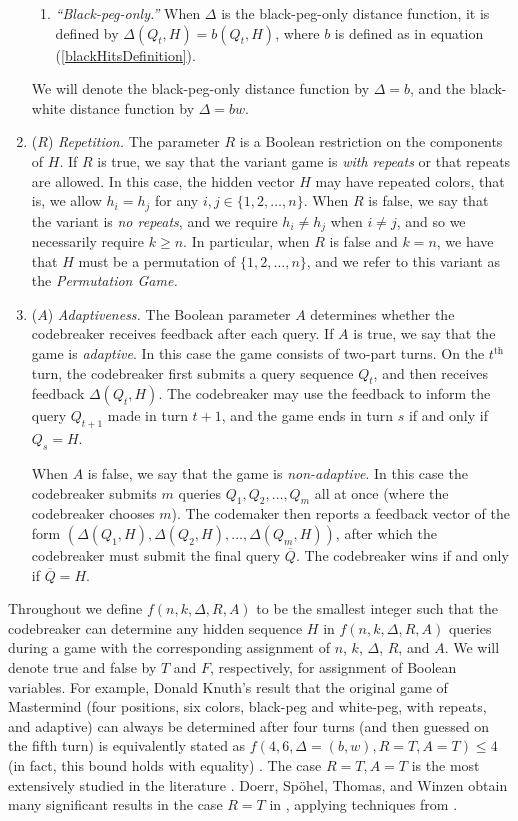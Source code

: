 \documentclass[12pt, a4paper]{article}
\newcommand{\nth}{^{\text{th}}}       %
\begin{document}
\begin{enumerate}[label=(\roman*)]
\begin{enumerate}[label=\alph*.]
		\item\textit{``Black-peg-only.''} When $\Delta$ is the black-peg-only distance function, it is defined by $\Delta(Q_t, H) = b(Q_t, H)$, where $b$ is defined as in equation (\ref{blackHitsDefinition}).
	\end{enumerate}
	We will denote the black-peg-only distance function by $\Delta = b$, and the black-white distance function by $\Delta = bw$.
	
	\item($R$) \textit{Repetition.} The parameter $R$ is a Boolean restriction on the components of $H$. If $R$ is true, we say that the variant game is \textit{with repeats} or that repeats are allowed. In this case, the hidden vector $H$ may have repeated colors, that is, we allow $h_i = h_j$ for any $i,j\in\{1,2,\ldots, n\}$. When $R$ is false, we say that the variant is \textit{no repeats}, and we require $h_i\neq h_j$ when $i\neq j$, and so we necessarily require $k \geq n$. In particular, when $R$ is false and $k = n$, we have that $H$ must be a permutation of $\{1, 2, \ldots, n\}$, and we refer to this variant as the \textit{Permutation Game.}
	
	\item($A$) \textit{Adaptiveness.} The Boolean parameter $A$ determines whether the codebreaker receives feedback after each query. If $A$ is true, we say that the game is \textit{adaptive}. In this case the game consists of two-part turns. On the $t\nth$ turn, the codebreaker first submits a query sequence $Q_t$, and then receives feedback $\Delta(Q_t, H)$. The codebreaker may use the feedback to inform the query $Q_{t+1}$ made in turn $t+1$, and the game ends in turn $s$ if and only if $Q_s = H$.
	
	When $A$ is false, we say that the game is \textit{non-adaptive}. In this case the codebreaker submits $m$ queries $Q_1, Q_2, \ldots, Q_m$ all at once (where the codebreaker chooses $m$). The codemaker then reports a feedback vector of the form $(\Delta(Q_1, H), \Delta(Q_2, H), \ldots, \Delta(Q_m, H))$, after which the codebreaker must submit the final query $\overline{Q}$. The codebreaker wins if and only if $\overline{Q} = H$.
\end{enumerate}

Throughout we define $f(n, k, \Delta, R, A)$ to be the smallest integer such that the codebreaker can determine any hidden sequence $H$ in $f(n, k, \Delta, R, A)$ queries during a game with the corresponding assignment of $n$, $k$, $\Delta$, $R$, and $A$. We will denote true and false by $T$ and $F$, respectively, for assignment of Boolean variables. For example, Donald Knuth's result that the original game of Mastermind (four positions, six colors, black-peg and white-peg, with repeats, and adaptive) can always be determined after four turns (and then guessed on the fifth turn) is equivalently stated as $f(4, 6, \Delta = (b,w), R=T, A=T)\le 4$ (in fact, this bound holds with equality) \cite{DK76}. The case $R = T, A = T$ is the most extensively studied in the literature \cite{CC05,VC83,MG12,DK76}. Doerr, Sp\"{o}hel, Thomas, and Winzen obtain many significant results in the case $R = T$ in \cite{DS13}, applying techniques from \cite{NB09,GK00}. 
\end{document}
